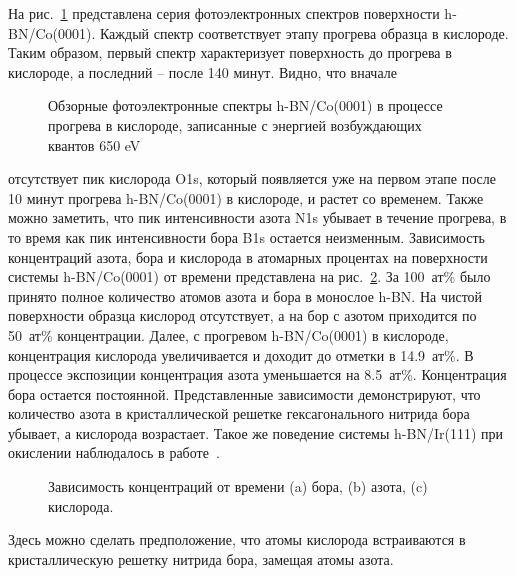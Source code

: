 На рис.~\ref{pic:Surveys} представлена серия фотоэлектронных спектров поверхности h-BN/Co(0001).
Каждый спектр соответствует этапу прогрева образца в кислороде. Таким образом, первый спектр характеризует
поверхность до прогрева в кислороде, а последний -- после 140 минут. Видно, что вначале
	\begin{figure}[!ht]
		\caption{Обзорные фотоэлектронные спектры h-BN/Co(0001) в процессе прогрева в кислороде, записанные с энергией
		возбуждающих квантов 650 eV}
		\label{pic:Surveys}
	\end{figure}
отсутствует пик кислорода O1s, который появляется уже на первом этапе после 10 минут 
прогрева h-BN/Co(0001) в кислороде, и растет со временем. Также можно заметить, что пик 
интенсивности азота N1s убывает в течение прогрева, в то время как пик 
интенсивности бора B1s остается неизменным. Зависимость концентраций азота, бора и кислорода 
в атомарных процентах на поверхности системы
h-BN/Co(0001) от времени представлена на рис.~\ref{pic:B_N_O_tot_percent}. За 100~ат\% было принято
полное количество атомов азота и бора в монослое h-BN.
На чистой поверхности образца кислород отсутствует, а на бор с азотом приходится
по 50~ат\% концентрации. Далее, с прогревом h-BN/Co(0001) в кислороде, концентрация кислорода увеличивается
и доходит до отметки в 14.9~ат\%. В процессе экспозиции концентрация азота уменьшается на 8.5~ат\%.
Концентрация бора остается постоянной. Представленные зависимости демонстрируют, что количество 
азота в кристаллической решетке гексагонального нитрида бора убывает, а кислорода возрастает.
Такое же поведение системы h-BN/Ir(111) при окислении наблюдалось в работе~\cite{Simonov2012_h-BN/Ir_Oxydation}. 
	\begin{figure}[!ht]
		\caption{Зависимость концентраций от времени (a) бора, (b) азота, (c) кислорода.}
		\label{pic:B_N_O_tot_percent}
	\end{figure}
Здесь можно сделать предположение, что атомы кислорода встраиваются в кристаллическую решетку
нитрида бора, замещая атомы азота.


